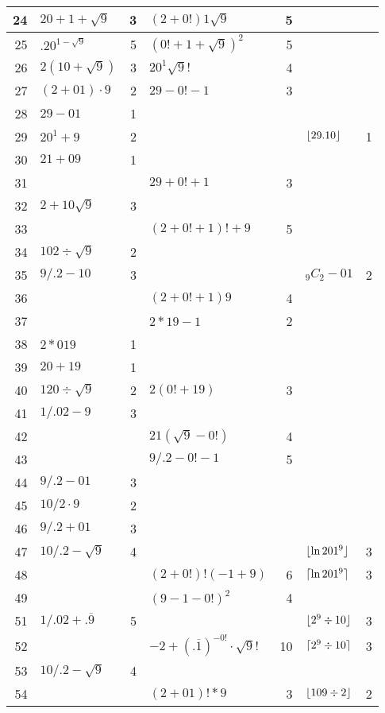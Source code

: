 \begin{longtable}{r l r l r l r}
24 & $20+1+\sqrt{9}$ & 3 & $(2+0!)1\sqrt{9}$ & 5 \\ \midrule
25 & $.20^{1-\sqrt{9}}$ & 5 & ${(0!+1+\sqrt{9})}^{2}$ & 5 \\ \midrule
26 & $2(10+\sqrt{9})$ & 3 & $20^1\sqrt{9}!$ & 4 \\ \midrule
27 & $(2+01) \cdot 9$ & 2 & $29-0!-1$ & 3 \\ \midrule
28 & $29-01$ & 1 \\ \midrule
29 & $20^1+9$ & 2 & & & $\lfloor29.10\rfloor$ & 1\\ \midrule
\midrule
30 & $21+09$ & 1 \\ \midrule
31 & & & $29+0!+1$ & 3 \\ \midrule
32 & $2 + 10\sqrt{9}$ & 3 \\ \midrule
33 & & & $(2+0!+1)!+9$ & 5 \\ \midrule
34 & $102 \div\sqrt{9}$ & 2 \\ \midrule
35 & $9/.2 - 10$& 3 & & & $_9C_2 - 01$ & 2 \\ \midrule
36 & & & $(2+0!+1)9$ & 4\\ \midrule
37 & & & $2*19-1$ & 2 \\ \midrule
38 & $2*019$ & 1 \\ \midrule
39 & $20+19$ & 1 \\ \midrule
\midrule
40 & $120 \div \sqrt{9}$ & 2 & $2(0!+19)$ & 3 \\ \midrule
41 & $1/.02-9$ & 3 \\ \midrule
42 & & & $21(\sqrt{9}-0!)$ & 4 \\ \midrule
43 & & & $9/.2 - 0! - 1$ & 5 \\ \midrule
44 & $9/.2 - 01$ & 3 \\ \midrule
45 & $10/2 \cdot 9$ & 2 & \\ \midrule
46 & $9/.2 + 01$ & 3 \\ \midrule
47 & $10/.2-\sqrt{9}$ & 4 & & & $\lfloor\ln 201^9\rfloor$ & 3 \\ \midrule
48 & & & $(2+0!)!(-1+9)$ & 6 & $\lceil\ln 201^9\rceil$ & 3 \\ \midrule
49 & & & ${(9-1-0!)}^2$ & 4 \\ \midrule
\midrule
51 & $1/.02 + .\overline{9}$ & 5 & & & $\lfloor2^9\div10\rfloor$ & 3 \\ \midrule
52 & & & $-2+(.\overline{1})^{-0!}\cdot\sqrt{9}!$ & 10 & $\lceil2^9\div10\rceil$ & 3 \\ \midrule
53 & $10/.2-\sqrt{9}$ & 4 \\ \midrule
54 & & & $(2+01)!*9$ & 3 & $\lfloor109\div2\rfloor$ & 2 \\ \midrule

\end{longtable}
